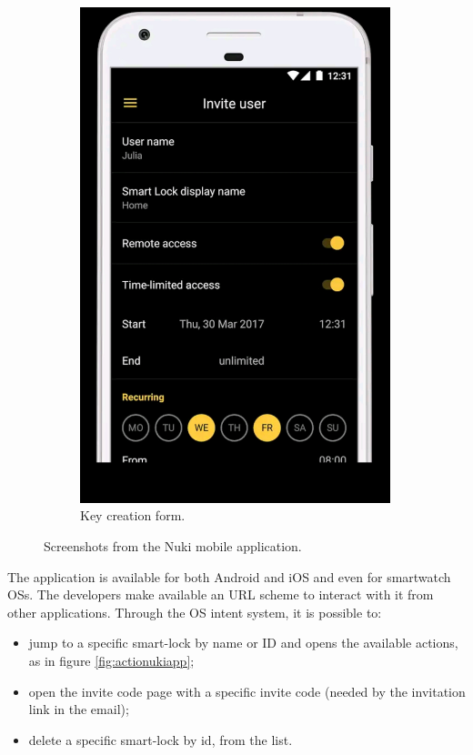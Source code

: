 \begin{figure}[ht]
\begin{subfigure}[b]{0.29\textwidth}
         \includegraphics[width=0.99\textwidth, frame]{figures/keynukiapp.jpg}
         \caption{Key creation form.}
         \label{fig:keynukiapp}
     \end{subfigure}
    \caption{Screenshots from the Nuki mobile application.}
    \label{fig:nukiapp}
\end{figure}

The application is available for both Android and iOS and even for smartwatch OSs. The developers make available an URL scheme to interact with it from other applications. Through the OS intent system, it is possible to:
\begin{itemize}
    \item jump to a specific smart-lock by name or ID and opens the available actions, as in figure \ref{fig:actionukiapp};
    \item open the invite code page with a specific invite code (needed by the invitation link in the email);
    \item delete a specific smart-lock by id, from the list.
\end{itemize}

